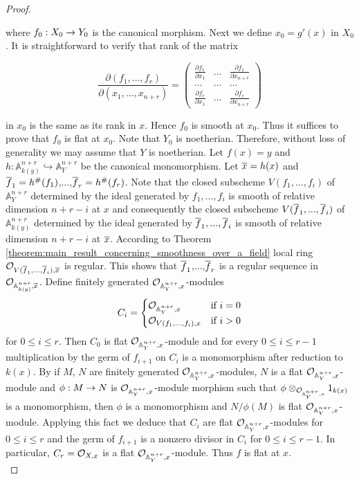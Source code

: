 \begin{proof}
\begin{center}
\end{center}
where $f_0:X_0\rightarrow Y_0$ is the canonical morphism. Next we define $x_0 = g'(x)$ in $X_0$. It is straightforward to verify that rank of the matrix
\begin{center}
\[ \frac{\partial(f_1,...,f_r)}{\partial(x_1,...,x_{n+r})}= \left( \begin{array}{ccc}
\frac{\partial f_1}{\partial x_1} & ... & \frac{\partial f_1}{\partial x_{n+r}} \\
... &...  &...  \\
\frac{\partial f_r}{\partial x_{1}} &...  & \frac{\partial f_r}{\partial x_{n+r}}\end{array} \right)\]
\end{center}
in $x_0$ is the same as its rank in $x$. Hence $f_0$ is smooth at $x_0$. Thus it suffices to prove that $f_0$ is flat at $x_0$. Note that $Y_0$ is noetherian. Therefore, without loss of generality we may assume that $Y$ is noetherian. Let $f(x) = y$ and $h:\mathbb{A}^{n+r}_{k(y)} \hookrightarrow \mathbb{A}^{n+r}_Y$ be the canonical monomorphism. Let $\overline{x} = h(x)$ and $\overline{f}_1=h^{\#}(f_1)$,...,$\overline{f}_r=h^{\#}(f_r)$. Note that the closed subscheme $V(f_1,...,f_i)$ of $\mathbb{A}^{n+r}_Y$ determined by the ideal generated by $f_1,...,f_i$ is smooth of relative dimension $n+r-i$ at $x$ and consequently the closed subscheme $V(\overline{f}_1,...,\overline{f}_i)$ of $\mathbb{A}^{n+r}_{k(y)}$ determined by the ideal generated by $\overline{f}_1,...,\overline{f}_i$ is smooth of relative dimension $n+r-i$ at $\overline{x}$. According to Theorem \ref{theorem:main_result_concerning_smoothness_over_a_field} local ring ${\mathcal O}_{V(\overline{f}_1,...,\overline{f}_i),\overline{x}}$ is regular. This shows that $\overline{f}_1$,...,$\overline{f}_r$ is a regular sequence in ${\mathcal O}_{\mathbb{A}^{n+r}_{k(y)},\overline{x}}$. Define finitely generated ${\mathcal O}_{\mathbb{A}^{n+r}_{Y},x}$-modules
$$C_i=\begin{cases} 
{\mathcal O}_{\mathbb{A}^{n+r}_{Y},x} &\mbox{if } i=0\\
{\mathcal O}_{V(f_1,...,f_i),x} &\mbox{if } i>0
\end{cases}$$
for $0\leq i\leq r$. Then $C_0$ is flat ${\mathcal O}_{\mathbb{A}^{n+r}_{Y},x}$-module and for every $0\leq i\leq r-1$ multiplication by the germ of $f_{i+1}$ on $C_i$ is a monomorphism after reduction to $k(x)$. By {\cite[Corollary 3.5]{Flatnessingeometry}} if $M$, $N$ are finitely generated ${\mathcal O}_{\mathbb{A}^{n+r}_{Y},x}$-modules, $N$ is a flat ${\mathcal O}_{\mathbb{A}^{n+r}_{Y},x}$-module and $\phi:M\rightarrow N$ is ${\mathcal O}_{\mathbb{A}^{n+r}_{Y},x}$-module morphism such that $\phi\otimes_{{\mathcal O}_{\mathbb{A}^{n+r}_{Y},x}}1_{k(x)}$ is a monomorphism, then $\phi$ is a monomorphism and $N/\phi(M)$ is flat ${\mathcal O}_{\mathbb{A}^{n+r}_{Y},x}$-module. Applying this fact we deduce that $C_i$ are flat ${\mathcal O}_{\mathbb{A}^{n+r}_{Y},x}$-modules for $0\leq i\leq r$ and the germ of $f_{i+1}$ is a nonzero divisor in $C_i$ for $0\leq i\leq r-1$. In particular, $C_r = {\mathcal O}_{X,x}$ is a flat ${\mathcal O}_{\mathbb{A}^{n+r}_{Y},x}$-module. Thus $f$ is flat at $x$. \\

\end{proof}
